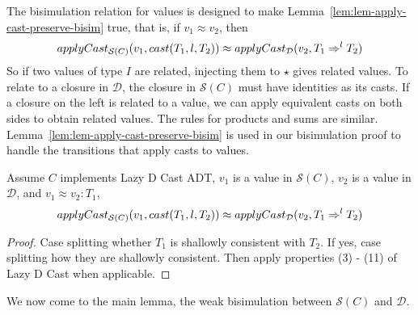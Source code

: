 \documentclass[acmsmall,review]{acmart}\settopmatter{printfolios=true,printccs=false,printacmref=false}
\newcommand{\TOOdyn}[0]{\star}
\newcommand{\cOOcast}[3]{#1 \Rightarrow^{#2} #3}
\newcommand{\ineffCEKD}{\ensuremath{\mathcal{D}}}
\newcommand{\effCEK}[1]{\ensuremath{\mathcal{S}(#1)}}
\begin{document}
The bisimulation relation for values is designed to make
Lemma~\ref{lem:lem-apply-cast-preserve-bisim} true, that is, if $v_1 \approx 
v_2$,
then
  \[
  applyCast_{\text{\effCEK{C}}}(v_1,cast(T_1,l,T_2)) 
  \approx 
  applyCast_{\text{\ineffCEKD}}(v_2,\cOOcast{T_1}{l}{T_2})
  \]
So if two values of type $I$ are related, injecting them to $\TOOdyn$
gives related values.
%
%
To relate to a closure in \ineffCEKD, the closure in \effCEK{C} must
have identities as its casts.
%
If a closure on the left is related to a value, we can apply
equivalent casts on both sides to obtain related values.
%
The rules for products and sums are similar.
%
Lemma~\ref{lem:lem-apply-cast-preserve-bisim} is used in our bisimulation proof 
to
handle the transitions that apply casts to values.

\begin{lemma}
  \label{lem:lem-apply-cast-preserve-bisim}
  Assume $C$ implements Lazy D Cast ADT,
  $v_1$ is a value in \effCEK{C},
  $v_2$ is a value in \ineffCEKD,
  and $v_1 \approx v_2 : T_1$,
  \[
  applyCast_{\text{\effCEK{C}}}(v_1,cast(T_1,l,T_2)) 
  \approx 
  applyCast_{\text{\ineffCEKD}}(v_2,\cOOcast{T_1}{l}{T_2})
  \]
\end{lemma}
\begin{proof}
  Case splitting whether $T_1$ is shallowly consistent with $T_2$.
  If yes, case splitting how they are shallowly consistent.
  Then apply properties (3) - (11) of Lazy D Cast when applicable.
\end{proof}

We now come to the main lemma, the weak bisimulation between
\effCEK{C} and \ineffCEKD{}.
\end{document}
